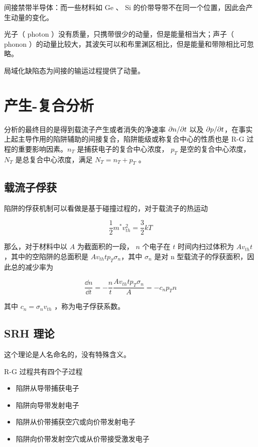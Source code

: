 \documentclass[cn,11pt,chinese,black,simple]{../elegantbook}
\begin{document}
间接禁带半导体：而一些材料如 Ge 、 Si 的价带导带不在同一个位置，因此会产生动量的变化。

光子（ photon ）没有质量，只携带很少的动量，但是能量相当大；声子（ phonon ）的动量比较大，其波矢可以和布里渊区相比，但是能量和带隙相比可忽略。

局域化缺陷态为间接的输运过程提供了动量。

\section{产生-复合分析}

分析的最终目的是得到载流子产生或者消失的净速率 \(\partial{}n/\partial{}t\) 以及 \(\partial{}p/\partial{}t\)，在事实上起主导作用的陷阱辅助的间接复合，陷阱能级或称复合中心的性质也是 R-G 过程的重要影响因素。\(n_T\) 是捕获电子的复合中心浓度， \(p_T\) 是空的复合中心浓度， \(N_T\) 是总复合中心浓度，满足 \(N_T = n_T + p_T\) 。

\subsection{载流子俘获}

陷阱的俘获机制可以看做是基于碰撞过程的，对于载流子的热运动

\[\dfrac{1}{2} m^* v_{th}^2 = \dfrac{3}{2} k T\] 

那么，对于材料中以 \(A\) 为截面积的一段， \(n\) 个电子在 \(t\) 时间内扫过体积为 \(A v_{th} t\) ，其中的空陷阱的总面积是 \(A v_{th} t p_T \sigma_n\)，其中 \(\sigma_n\) 是对 n 型载流子的俘获面积，因此总的减少率为 

\[\dfrac{\dd{n}}{\dd{t}} = - \dfrac{n}{t} \dfrac{A v_{th} t p_T \sigma_n}{A} = -c_n p_T n\]

其中 \(c_n = \sigma_n v_{th}\) ，称为电子俘获系数。

\subsection{SRH 理论}

这个理论是人名命名的，没有特殊含义。

R-G 过程共有四个子过程

\begin{itemize}
    \item 陷阱从导带捕获电子
    \item 陷阱向导带发射电子
    \item 陷阱从价带捕获空穴或向价带发射电子
    \item 陷阱向价带发射空穴或从价带接受激发电子
\end{itemize}
\end{document}
